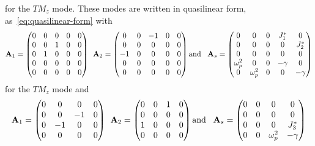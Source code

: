 for the $TM_z$ mode. These modes are written in quasilinear form, as~\eqref{eq:quasilinear-form} with
\begin{align*}
  \mathbf{A}_1 = 
  \begin{pmatrix}
    0 & 0 & 0 & 0 & 0 \\
    0 & 0 & 1 & 0 & 0 \\
    0 & 1 & 0 & 0 & 0 \\
    0 & 0 & 0 & 0 & 0 \\
    0 & 0 & 0 & 0 & 0 \\
  \end{pmatrix}
  \: \:
  \mathbf{A}_2 = 
  \begin{pmatrix}
    0 & 0 &-1 & 0 & 0 \\
    0 & 0 & 0 & 0 & 0 \\
   -1 & 0 & 0 & 0 & 0 \\
    0 & 0 & 0 & 0 & 0 \\
    0 & 0 & 0 & 0 & 0 \\
  \end{pmatrix}
  \textrm{and}\;\;\;
  \mathbf{A}_s = 
  \begin{pmatrix}
    0 & 0 & 0 & J_{1}^* & 0 \\
    0 & 0 & 0 & 0 & J_{2}^* \\
    0 & 0 & 0 & 0 & 0 \\
    \omega_p^2 & 0 & 0 & -\gamma & 0 \\
    0 & \omega_p^2 & 0 & 0 & -\gamma \\
  \end{pmatrix}
\end{align*}
for the $TM_z$ mode and 
\begin{align*}
  \mathbf{A}_1 = 
  \begin{pmatrix}
    0 & 0 & 0 & 0 \\
    0 & 0 &-1 & 0 \\
    0 &-1 & 0 & 0 \\
    0 & 0 & 0 & 0 \\
  \end{pmatrix}
  \: \:
  \mathbf{A}_2 = 
  \begin{pmatrix}
    0 & 0 & 1 & 0 \\
    0 & 0 & 0 & 0 \\
    1 & 0 & 0 & 0 \\
    0 & 0 & 0 & 0 \\
  \end{pmatrix}
  \textrm{and}\;\;\;
  \mathbf{A}_s = 
  \begin{pmatrix}
    0 & 0 & 0 & 0 \\
    0 & 0 & 0 & 0 \\
    0 & 0 & 0 & J_{3}^* \\
    0 & 0 & \omega_p^2 & -\gamma \\
  \end{pmatrix}
\end{align*}

